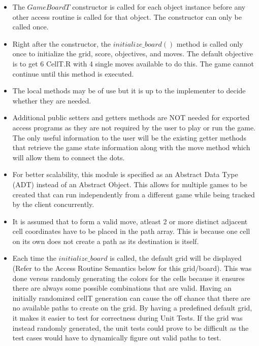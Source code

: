 \documentclass[12pt]{article}
\begin{document}
\begin{itemize}
\item The $GameBoardT$ constructor is called for each object instance before any other access routine is called for that object. The constructor can only be called once.

\item Right after the constructor, the $initialize\_board()$ method is called only once to initialize the grid, score, objectives, and moves. The default objective is to get 6 CellT.R with 4 single moves available to do this. The game cannot continue until this method is executed.

\item The local methods may be of use but it is up to the implementer to decide whether they are needed.

\item Additional public setters and getters methods are NOT needed for exported access programs as they are not required by the user to play or run the game. The only useful information to the user will be the existing getter methods that retrieve the game state information along with the move method which will allow them to connect the dots.

\item For better scalability, this module is specified as an Abstract Data Type (ADT) instead of an Abstract Object. This allows for multiple games to be created that can run independently from a different game while being tracked by the client concurrently.

\item It is assumed that to form a valid move, atleast 2 or more distinct adjacent cell coordinates have to be placed in the path array. This is because one cell on its own does not create a path as its destination is itself.

\item Each time the $initialize\_board$ is called, the default grid will be displayed (Refer to the Access Routine Semantics below for this grid/board). This was done versus randomly generating the colors for the cells because it ensures there are always some possible combinations that are valid. Having an initially randomized cellT generation can cause the off chance that there are no available paths to create on the grid. By having a predefined default grid, it makes it easier to test for correctness during Unit Tests. If the grid was instead randomly generated, the unit tests could prove to be difficult as the test cases would have to dynamically figure out valid paths to test.


\end{itemize}
\end{document}
